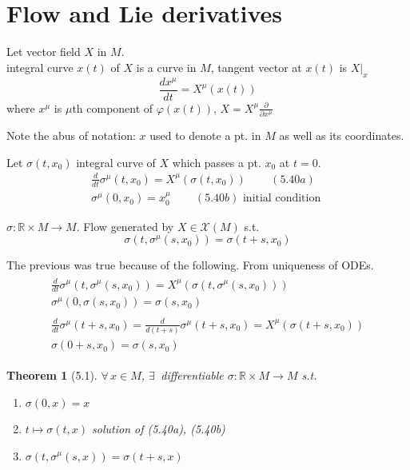 \documentclass{book}
\newtheorem{theorem}{Theorem}
\begin{document}
\section{ Flow and Lie derivatives }


Let vector field $X$ in $M$.  \\
integral curve $x(t)$ of $X$ is a curve in $M$, tangent vector at $x(t)$ is $\left. X \right|_x$ 
\[
\frac{dx^{\mu}}{ dt} = X^{\mu}(x(t))
\]
where $x^{\mu}$ is $\mu$th component of $\varphi(x(t))$, $X = X^{\mu} \frac{ \partial }{ \partial x^{\mu }}$


Note the abus of notation: $x$ used to denote a pt. in $M$ as well as its coordinates.  

Let $\sigma(t,x_0)$ integral curve of $X$ which passes a pt. $x_0$ at $t=0$.  
\begin{gather}
  \frac{d}{dt} \sigma^{\mu}(t,x_0) = X^{\mu}(\sigma(t,x_0)) \quad \quad \, (5.40a) \\ 
  \sigma^{\mu}(0, x_0) = x_0^{\mu} \quad \quad \, (5.40b) \text{ initial condition }
\end{gather}

$\sigma : \mathbb{R} \times M \to M$.  Flow generated by $X \in \mathcal{X}(M)$ s.t. 
\[
\sigma(t, \sigma^{\mu}(s,x_0) ) = \sigma( t+ s ,x_0)
\]

The previous was true because of the following.  From uniqueness of ODEs.
\[
\begin{gathered}
  \begin{gathered} 
    \frac{d}{dt} \sigma^{\mu}(t, \sigma^{\mu}(s,x_0) ) = X^{\mu}( \sigma(t, \sigma^{\mu}(s,x_0)) ) \\ 
    \sigma^{\mu}(0 , \sigma(s,x_0) ) = \sigma(s,x_0) \end{gathered} \\ 
  \begin{gathered}
    \frac{d}{dt} \sigma^{\mu}( t+ s ,x_0) = \frac{d}{d (t+s) } \sigma^{\mu}(t+s , x_0 ) = X^{\mu}(\sigma(t+s, x_0)) \\ 
    \sigma( 0 + s, x_0) = \sigma(s,x_0)
\end{gathered}
\end{gathered}
\]

\begin{theorem}[5.1] $\forall \, x \in M$, $\exists \, $ differentiable $\sigma: \mathbb{R} \times M \to M$ s.t. 
\begin{enumerate}
\item[(i)] $\sigma(0,x) = x$ 
\item[(ii)] $t \mapsto \sigma(t,x)$ solution of (5.40a), (5.40b) 
\item[(iii)] $\sigma(t, \sigma^{\mu}(s,x)) = \sigma(t+s,x)$
\end{enumerate}
\end{theorem}
\end{document}
